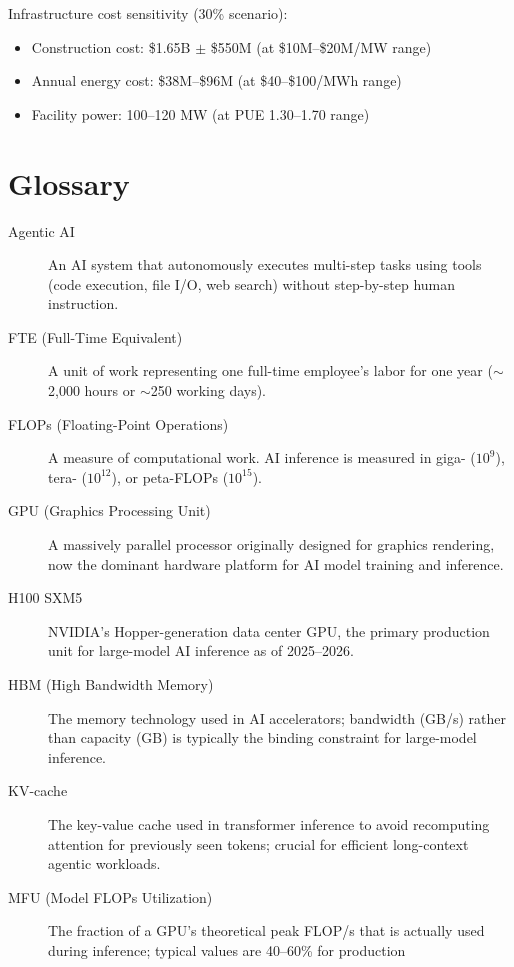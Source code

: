 \documentclass{article}
\begin{document}
Infrastructure cost sensitivity (30\% scenario):
\begin{itemize}
  \item Construction cost: \$1.65B $\pm$ \$550M (at \$10M--\$20M/MW range)
  \item Annual energy cost: \$38M--\$96M (at \$40--\$100/MWh range)
  \item Facility power: 100--120 MW (at PUE 1.30--1.70 range)
\end{itemize}

\section{Glossary}
\label{app:glossary}

\begin{description}
  \item[Agentic AI] An AI system that autonomously executes multi-step tasks using tools
    (code execution, file I/O, web search) without step-by-step human instruction.
  \item[FTE (Full-Time Equivalent)] A unit of work representing one full-time employee's
    labor for one year ($\sim$2,000 hours or $\sim$250 working days).
  \item[FLOPs (Floating-Point Operations)] A measure of computational work. AI inference
    is measured in giga- ($10^9$), tera- ($10^{12}$), or peta-FLOPs ($10^{15}$).
  \item[GPU (Graphics Processing Unit)] A massively parallel processor originally designed
    for graphics rendering, now the dominant hardware platform for AI model training and
    inference.
  \item[H100 SXM5] NVIDIA's Hopper-generation data center GPU, the primary production
    unit for large-model AI inference as of 2025--2026.
  \item[HBM (High Bandwidth Memory)] The memory technology used in AI accelerators;
    bandwidth (GB/s) rather than capacity (GB) is typically the binding constraint for
    large-model inference.
  \item[KV-cache] The key-value cache used in transformer inference to avoid recomputing
    attention for previously seen tokens; crucial for efficient long-context agentic
    workloads.
  \item[MFU (Model FLOPs Utilization)] The fraction of a GPU's theoretical peak FLOP/s
    that is actually used during inference; typical values are 40--60\% for production

\end{description}
\end{document}
